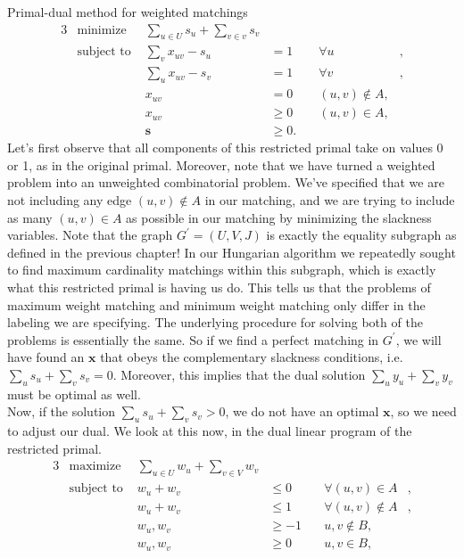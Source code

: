 \begin{section}{Primal-dual method for weighted matchings}
\begin{alignat}{3}
		& \text{minimize } & \sum_{u\in U} s_u + \sum_{v\in v} s_v & \\
		& \text{subject to } & \sum_v x_{uv} - s_u & = 1 & \quad \forall u &, \\
				     && \sum_u x_{uv} - s_v & = 1 & \quad \forall v &, \\
				     && x_{uv} & = 0 & \quad (u,v)\notin A, \\
				     && x_{uv} & \geq 0 & \quad (u,v)\in A, \\
				     && \mathbf{s} & \geq 0.
	\end{alignat}
	Let's first observe that all components of this restricted primal take on values 0 or 1, as 
	in the original primal. Moreover, note that we have turned a weighted problem into an 
	unweighted combinatorial problem. We've specified that we are not including any edge 
	$(u,v)\notin A$ in our matching, and we are trying to include as many $(u,v)\in A$ as possible 
	in our matching by minimizing the slackness variables. Note that the graph $G^{'} = (U,V,J)$ 
	is exactly the equality subgraph as defined in the previous chapter! In our Hungarian algorithm 
	we repeatedly sought to find maximum cardinality matchings within this subgraph, which is 
	exactly what this restricted primal is having us do. This tells us that the problems of maximum 
	weight matching and minimum weight matching only differ in the labeling we are specifying. The 
	underlying procedure for solving both of the problems is essentially the same. So if we find a 
	perfect matching in $G^{'}$, we will have found an $\mathbf{x}$ that obeys the complementary 
	slackness conditions, i.e. $\sum_u s_u + \sum_v s_v = 0$. Moreover, this implies that the 
	dual solution $\sum_u y_u + \sum_v y_v$ must be optimal as well.\\
	Now, if the solution $\sum_u s_u + \sum_v s_v > 0$, we do not have an optimal $\mathbf{x}$, 
	so we need to adjust our dual. We look at this now, in the dual linear program of the 
	restricted primal.
	\begin{alignat}{3}
		& \text{maximize } & \sum_{u\in U} w_u + \sum_{v\in V} w_v & \\
		& \text{subject to } & w_u + w_v & \leq 0 & \quad \forall (u,v)\in A &, \\
				     && w_u + w_v & \leq 1 & \quad \forall (u,v)\notin A &, \\
				     && w_u,w_v & \geq -1 & \quad u,v\notin B, \\
				     && w_u,w_v & \geq 0 & \quad u,v\in B, \\

\end{alignat}
\end{section}

